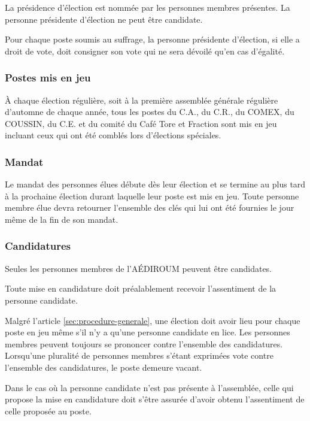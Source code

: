 \documentclass{aediroum}
\newcommand{\article}[1]{article \ref{#1}}
\begin{document}
La présidence d'élection est nommée par les personnes membres présentes. La personne présidente d'élection ne peut être candidate.

Pour chaque poste soumis au suffrage, la personne présidente d'élection, si elle a droit de vote, doit consigner son vote qui ne sera dévoilé qu'en cas d'égalité.

\subsubsection{Postes mis en jeu}\label{sec:postes-mis-en-jeu}
À chaque élection régulière, soit à la première assemblée générale régulière d'automne de chaque année, tous les postes du C.A., du C.R., du COMEX, du COUSSIN, du C.E. et du comité du Café Tore et Fraction sont mis en jeu incluant ceux qui ont été comblés lors d'élections spéciales.

\subsubsection{Mandat}\label{sec:mandat}

Le mandat des personnes élues débute dès leur élection et se termine au plus tard à la prochaine élection durant laquelle leur poste est mis en jeu.
Toute personne membre élue devra retourner l'ensemble des clés qui lui ont été fournies le jour même de la fin de son mandat.

\subsubsection{Candidatures}\label{sec:candidatures}

Seules les personnes membres de l'AÉDIROUM peuvent être candidates.

Toute mise en candidature doit préalablement recevoir l'assentiment de la personne candidate.

Malgré l'\article{sec:procedure-generale}, une élection doit avoir lieu pour chaque poste en jeu même s'il n'y a qu'une personne candidate en lice. Les personnes membres peuvent toujours se prononcer contre l'ensemble des candidatures. Lorsqu'une pluralité de personnes membres s'étant exprimées vote contre l'ensemble des candidatures, le poste demeure vacant.

Dans le cas où la personne candidate n'est pas présente à l'assemblée, celle qui propose la mise en candidature doit s'être assurée d'avoir obtenu l'assentiment de celle proposée au poste.
\end{document}
